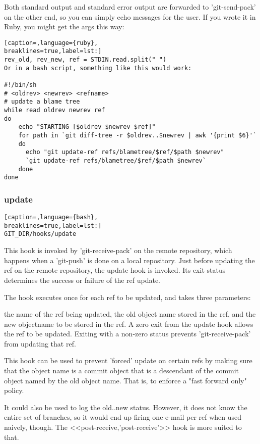Both standard output and standard error output are forwarded to 'git-send-pack'
on the other end, so you can simply echo messages for the user.
If you wrote it in Ruby, you might get the args this way:
\lstset{basicstyle=\scriptsize, numbers=none, captionpos=b, tabsize=4}
\begin{lstlisting}[caption=,language={ruby},
breaklines=true,label=lst:]
rev_old, rev_new, ref = STDIN.read.split(" ")
Or in a bash script, something like this would work:

#!/bin/sh
# <oldrev> <newrev> <refname>
# update a blame tree
while read oldrev newrev ref
do
    echo "STARTING [$oldrev $newrev $ref]"
    for path in `git diff-tree -r $oldrev..$newrev | awk '{print $6}'`
    do
      echo "git update-ref refs/blametree/$ref/$path $newrev"
      `git update-ref refs/blametree/$ref/$path $newrev`
    done
done
\end{lstlisting}

\subsubsection{update}
\lstset{basicstyle=\scriptsize, numbers=none, captionpos=b, tabsize=4}
\begin{lstlisting}[caption=,language={bash},
breaklines=true,label=lst:]
GIT_DIR/hooks/update
\end{lstlisting}

This hook is invoked by 'git-receive-pack' on the remote repository, which
happens when a 'git-push' is done on a local repository. Just before updating
the ref on the remote repository, the update hook is invoked. Its exit status
determines the success or failure of the ref update.

The hook executes once for each ref to be updated, and takes three parameters:

the name of the ref being updated, the old object name stored in the ref, and
the new objectname to be stored in the ref.  A zero exit from the update hook
allows the ref to be updated. Exiting with a non-zero status prevents
'git-receive-pack' from updating that ref.

This hook can be used to prevent 'forced' update on certain refs by making sure
that the object name is a commit object that is a descendant of the commit
object named by the old object name. That is, to enforce a "fast forward only"
policy.

It could also be used to log the old..new status. However, it does not know the
entire set of branches, so it would end up firing one e-mail per ref when used
naively, though. The <<post-receive,'post-receive'>> hook is more suited to
that.

